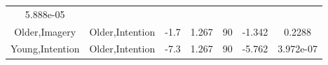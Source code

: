 \documentclass[]{article}
\theoremstyle{definition}
\theoremstyle{definition}
\theoremstyle{definition}
\theoremstyle{remark}
\begin{document}
\begin{longtable}[]{@{}ccccccc@{}}
\begin{minipage}[t]{0.11\columnwidth}
5.888e-05\strut
\end{minipage}\tabularnewline
\begin{minipage}[t]{0.16\columnwidth}\centering\strut
Older,Imagery\strut
\end{minipage} & \begin{minipage}[t]{0.16\columnwidth}\centering\strut
Older,Intention\strut
\end{minipage} & \begin{minipage}[t]{0.10\columnwidth}\centering\strut
-1.7\strut
\end{minipage} & \begin{minipage}[t]{0.11\columnwidth}\centering\strut
1.267\strut
\end{minipage} & \begin{minipage}[t]{0.05\columnwidth}\centering\strut
90\strut
\end{minipage} & \begin{minipage}[t]{0.11\columnwidth}\centering\strut
-1.342\strut
\end{minipage} & \begin{minipage}[t]{0.11\columnwidth}\centering\strut
0.2288\strut
\end{minipage}\tabularnewline
\begin{minipage}[t]{0.16\columnwidth}\centering\strut
Young,Intention\strut
\end{minipage} & \begin{minipage}[t]{0.16\columnwidth}\centering\strut
Older,Intention\strut
\end{minipage} & \begin{minipage}[t]{0.10\columnwidth}\centering\strut
-7.3\strut
\end{minipage} & \begin{minipage}[t]{0.11\columnwidth}\centering\strut
1.267\strut
\end{minipage} & \begin{minipage}[t]{0.05\columnwidth}\centering\strut
90\strut
\end{minipage} & \begin{minipage}[t]{0.11\columnwidth}\centering\strut
-5.762\strut
\end{minipage} & \begin{minipage}[t]{0.11\columnwidth}\centering\strut
3.972e-07\strut
\end{minipage}\tabularnewline
\bottomrule
\end{longtable}
\end{document}
